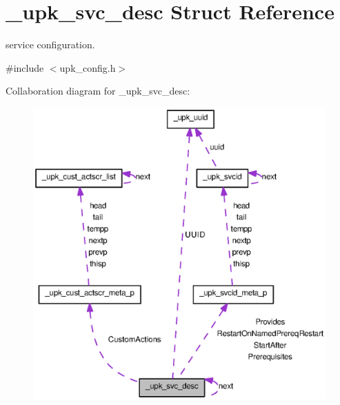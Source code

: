 \section{\_\-upk\_\-svc\_\-desc Struct Reference}
\label{struct__upk__svc__desc}


service configuration.  




{\ttfamily \#include $<$upk\_\-config.h$>$}



Collaboration diagram for \_\-upk\_\-svc\_\-desc:
\nopagebreak
\begin{figure}[H]
\begin{center}
\leavevmode
\includegraphics[width=400pt]{struct__upk__svc__desc__coll__graph}
\end{center}
\end{figure}
